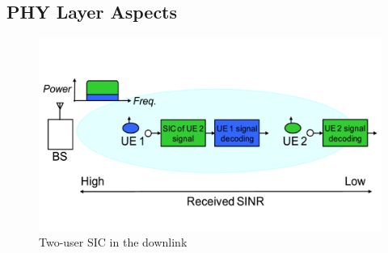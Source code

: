 \subsection{PHY Layer Aspects}
\label{sec_phy}


\begin{figure}[t]
\begin{center}
\includegraphics[width=1\columnwidth ,angle=0]{figure/NOMA_shannon}
\caption{Two-user SIC in the downlink}
\label{fig_NOMA_shannon}
\end{center}
\end{figure}
%


